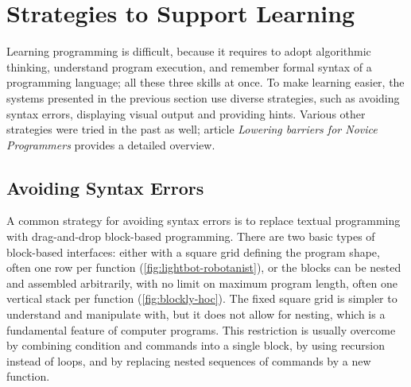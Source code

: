 

\section{Strategies to Support Learning}
\label{sec:strategies-for-easier-learning}

Learning programming is difficult,
  because it requires
  to adopt algorithmic thinking,
  understand program execution,
  and remember formal syntax of a programming language;
  all these three skills at once. %
To make learning easier,
  the systems presented in the previous section use diverse strategies,
  such as avoiding syntax errors,
  displaying visual output
  and providing hints.
Various other strategies were tried in the past as well;
article \emph{Lowering barriers for Novice Programmers}
  \cite{lowering-barriers}
  provides a detailed overview.


\subsection{Avoiding Syntax Errors}
\label{sec:avoiding-syntax-errors}

A common strategy for avoiding syntax errors is to replace textual programming
with drag-and-drop block-based programming.
There are two basic types of block-based interfaces:
  either with a square grid defining the program shape,
  often one row per function
  (\cref{fig:lightbot-robotanist}),
  or the blocks can be nested and assembled arbitrarily,
  with no limit on maximum program length,
  often one vertical stack per function
  (\cref{fig:blockly-hoc}).
The fixed square grid is simpler to understand and manipulate with,
  but it does not allow for nesting,
  which is a fundamental feature of computer programs.
This restriction is usually overcome by
  combining condition and commands into a single block,
  by using recursion instead of loops,
  and by replacing nested sequences of commands by a new function.


